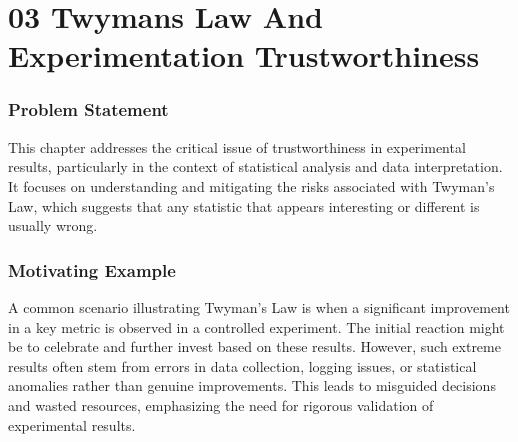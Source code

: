 \documentclass{article}
\begin{document}
\section*{03 Twymans Law And Experimentation Trustworthiness}
\subsubsection*{Problem Statement}
This chapter addresses the critical issue of trustworthiness in experimental results, particularly in the context of statistical analysis and data interpretation. It focuses on understanding and mitigating the risks associated with Twyman's Law, which suggests that any statistic that appears interesting or different is usually wrong.

\subsubsection*{Motivating Example}
A common scenario illustrating Twyman's Law is when a significant improvement in a key metric is observed in a controlled experiment. The initial reaction might be to celebrate and further invest based on these results. However, such extreme results often stem from errors in data collection, logging issues, or statistical anomalies rather than genuine improvements. This leads to misguided decisions and wasted resources, emphasizing the need for rigorous validation of experimental results.
\end{document}
